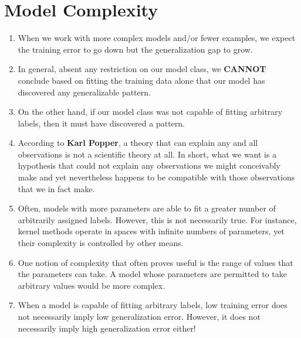 






\section{Model Complexity \cite{dnn-1}}
\begin{enumerate}[itemsep=0.2cm]
    \item When we work with more complex models and/or fewer examples, we expect the training error to go down but the generalization gap to grow. \cite{dnn-1}

    \item In general, absent any restriction on our model class, we \textbf{CANNOT} conclude based on fitting the training data alone that our model has discovered any generalizable pattern. \cite{dnn-1}

    \item On the other hand, if our model class was not capable of fitting arbitrary labels, then it must have discovered a pattern. \cite{dnn-1}

    \item According to \textbf{Karl Popper}, a theory that can explain any and all observations is not a scientific theory at all. In short, what we want is a hypothesis that could not explain any observations we might conceivably make and yet nevertheless happens to be compatible with those observations that we in fact make. \cite{dnn-1}

    \item Often, models with more parameters are able to fit a greater number of arbitrarily assigned labels. However, this is not necessarily true. For instance, kernel methods operate in spaces with infinite numbers of parameters, yet their complexity is controlled by other means.

    \item One notion of complexity that often proves useful is the range of values that the parameters can take. A model whose parameters are permitted to take arbitrary values would be more complex.

    \item When a model is capable of fitting arbitrary labels, low training error does not necessarily imply low generalization error. However, it does not necessarily imply high generalization error either!


\end{enumerate}
